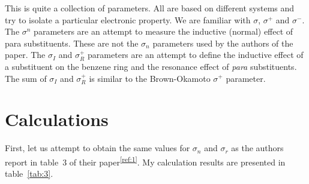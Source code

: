 \documentclass{tufte-handout}
\newcommand{\tss}[1]{\textsuperscript{#1}}
\begin{document}
This is quite a collection of parameters. All are based on different systems and try to isolate a particular electronic property. We are familiar with $\sigma$, $\sigma^+$ and $\sigma^-$. The $\sigma^n$ parameters are an attempt to measure the inductive (normal) effect of para substituents. These are not the $\sigma_n$ parameters used by the authors of the paper.
The $\sigma_I$ and $\sigma^+_R$ parameters are an attempt to define the inductive effect of a substituent on the benzene ring and the resonance effect of \textit{para} substituents. The sum of $\sigma_I$ and $\sigma^+_R$ is similar to the Brown-Okamoto $\sigma^+$ parameter.

\section{Calculations}

First, let us attempt to obtain the same values for $\sigma_n$ and $\sigma_r$ as the authors report in table~3 of their paper\tss{\ref{ref:1}}. My calculation results are presented in table~\vref{tab:3}. 






\end{document}
